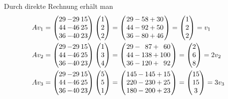 \begin{loesung}
Durch direkte Rechnung erhält man
\begin{align*}
Av_1
&=
\begin{pmatrix*}
29&-29&15\\
44&-46&25\\
36&-40&23
\end{pmatrix*}
\begin{pmatrix*}[r]
1\\2\\2
\end{pmatrix*}
=
\left(
\renewcommand{\arraycolsep}{1pt}
\begin{array}{rcrcr}
29&-&58&+&30\\
44&-&92&+&50\\
36&-&80&+&46
\end{array}
\right)
=
\begin{pmatrix*}
1\\2\\2
\end{pmatrix*}
=
v_1
\\
Av_2
&=
\begin{pmatrix*}
29&-29&15\\
44&-46&25\\
36&-40&23
\end{pmatrix*}
\begin{pmatrix*}[r]
1\\3\\4
\end{pmatrix*}
=
\left(
\renewcommand{\arraycolsep}{1pt}
\begin{array}{rcrcr}
29&-& 87&+& 60\\
44&-&138&+&100\\
36&-&120&+& 92
\end{array}
\right)
=
\begin{pmatrix*}
2\\6\\8
\end{pmatrix*}
=
2
v_2
\\
Av_3
&=
\begin{pmatrix*}
29&-29&15\\
44&-46&25\\
36&-40&23
\end{pmatrix*}
\begin{pmatrix*}[r]
5\\5\\1
\end{pmatrix*}
=
\left(
\renewcommand{\arraycolsep}{1pt}
\begin{array}{rcrcr}
145&-&145&+& 15\\
220&-&230&+& 25\\
180&-&200&+& 23
\end{array}
\right)
=
\begin{pmatrix*}
15\\15\\3
\end{pmatrix*}
=
3v_3
\end{align*}
\end{loesung}
